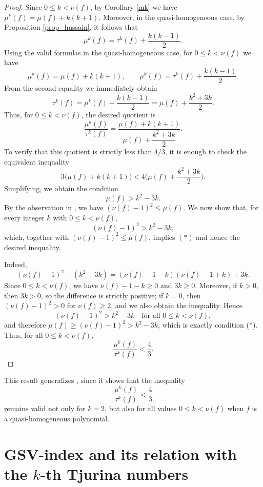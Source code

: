 \documentclass[12pt,letterpaper]{amsart}
\begin{document}
\begin{proof}
Since $0\leq k<\nu(f)$, by Corollary \ref{mk} we have $\mu^{k}(f)=\mu(f)+k(k+1)$. Moreover, in the quasi-homogeneous case, by Proposition \ref{prop_hussain}, it follows that 
\[
\mu^{k}(f)=\tau^{k}(f)+\frac{k(k-1)}{2}.
\]
Using the valid formulas in the quasi-homogeneous case, for \(0\le k<\nu(f)\) we have
\[
\mu^k(f)=\mu(f)+k(k+1),
\qquad
\mu^k(f)=\tau^k(f)+\frac{k(k-1)}{2}.
\]
From the second equality we immediately obtain
\[
\tau^k(f)=\mu^k(f)-\frac{k(k-1)}{2}=\mu(f)+\frac{k^2+3k}{2}.
\]
Thus, for \(0\le k<\nu(f)\), the desired quotient is
\[
\frac{\mu^k(f)}{\tau^k(f)}
= \frac{\mu(f)+k(k+1)}{\mu(f)+\dfrac{k^2+3k}{2}}.
\]
To verify that this quotient is strictly less than \(4/3\), it is enough to check the equivalent inequality
\[
3\big(\mu(f)+k(k+1)\big) < 4\Big(\mu(f)+\frac{k^2+3k}{2}\Big).
\]
Simplifying, we obtain the condition
\[
\mu(f) > k^2-3k.
\tag{*}
\]
By the observation in \cite[Remark 7.4]{Arturo}, we have \((\nu(f)-1)^2\le \mu(f)\). We now show that, for every integer \(k\) with \(0\le k<\nu(f)\),
\[
(\nu(f)-1)^2 > k^2-3k,
\]
which, together with \((\nu(f)-1)^2\le\mu(f)\), implies \((*)\) and hence the desired inequality.

Indeed,
\[
(\nu(f)-1)^2 - (k^2-3k)
= (\nu(f)-1-k)(\nu(f)-1+k) + 3k.
\]
Since \(0\le k<\nu(f)\), we have \(\nu(f)-1-k\ge 0\) and \(3k\ge 0\). Moreover, if \(k>0\), then \(3k>0\), so the difference is strictly positive; if \(k=0\), then \((\nu(f)-1)^2>0\) for \(\nu(f)\ge 2\), and we also obtain the inequality. Hence
\[
(\nu(f)-1)^2 > k^2-3k \quad\text{for all }0\le k<\nu(f),
\]
and therefore \(\mu(f)\ge(\nu(f)-1)^2>k^2-3k\), which is exactly condition (\(*\)). Thus, for all \(0\le k<\nu(f)\),
\[
\frac{\mu^k(f)}{\tau^k(f)}<\frac{4}{3}.
\]
\end{proof}

\par This result generalizes \cite[Theorem E]{Hussain_1}, since it shows that the inequality 
\[
\frac{\mu^{k}(f)}{\tau^{k}(f)} < \frac{4}{3}
\]
remains valid not only for $k=2$, but also for all values $0\leq k<\nu(f)$ when $f$ is a quasi-homogeneous polynomial.


\section{GSV-index and its relation with the $k$-th Tjurina numbers}\label{GSV-section}
\end{document}
